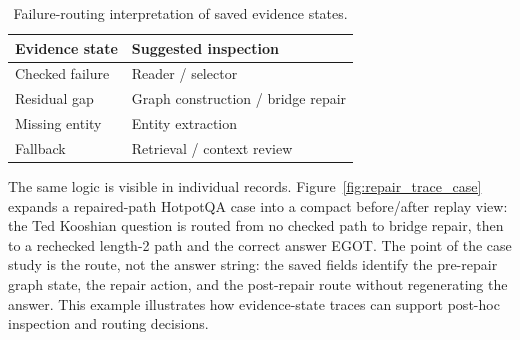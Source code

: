 \documentclass[runningheads,a4paper]{llncs}
\begin{document}
\begin{table}[!htbp]
\centering
\caption{Failure-routing interpretation of saved evidence states.}
\label{tab:routing_inspection}
\scriptsize
\setlength{\tabcolsep}{5.0pt}
\begin{tabular}{ll}
\toprule
Evidence state & Suggested inspection \\
\midrule
Checked failure & Reader / selector \\
Residual gap & Graph construction / bridge repair \\
Missing entity & Entity extraction \\
Fallback & Retrieval / context review \\
\bottomrule
\end{tabular}
\end{table}

\begin{table}[!htbp]
\centering
\caption{Conditional routing utility of graph state inside answer-selection
queues. Error-rate deltas use Wilson/Newcombe 95\% intervals.}
\label{tab:routing_utility}
\scriptsize
\setlength{\tabcolsep}{3.0pt}
\end{table}

The same logic is visible in individual records. Figure~\ref{fig:repair_trace_case}
expands a repaired-path HotpotQA case into a compact before/after replay view:
the Ted Kooshian question is routed from no checked path to bridge repair,
then to a rechecked length-2 path and the correct answer EGOT. The point of the
case study is the route, not the answer string: the saved fields identify the
pre-repair graph state, the repair action, and the post-repair route without
regenerating the answer. This example illustrates how evidence-state traces can
support post-hoc inspection and routing decisions.
\end{document}
